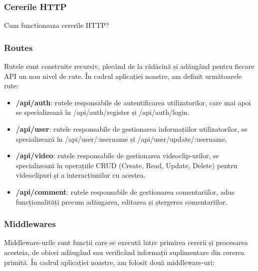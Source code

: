 \subsubsection{Cererile HTTP}
Cum functioneaza cererile HTTP?

\subsubsection{Routes}
Rutele sunt construite recursiv, plecând de la rădăcină și adăugând pentru fiecare API 
un nou nivel de rute. În cadrul aplicației noastre, am definit următoarele rute:

\begin{itemize}
    \item \textbf{/api/auth}: rutele responsabile de autentificarea utilizatorilor, care mai apoi 
    se specializează în /api/auth/register și /api/auth/login.
    \item \textbf{/api/user}: rutele responsabile de gestionarea informațiilor utilizatorilor, se 
    specializează în /api/user/:username și /api/user/update/:username.
    \item \textbf{/api/video}: rutele responsabile de gestionarea videoclip-urilor, se specializează
    în operațiile CRUD (Create, Read, Update, Delete) pentru videoclipuri și a interacțiunilor cu acestea.
    \item \textbf{/api/comment}: rutele responsabile de gestionarea comentariilor, aduc funcționalități
    precum adăugarea, editarea și ștergerea comentariilor.
\end{itemize}

\subsubsection{Middlewares}
Middleware-urile sunt funcții care se execută între primirea cererii și procesarea acesteia,
de obicei adăugând sau verificând informații suplimentare din cererea primită. În cadrul
aplicației noastre, am folosit două middleware-uri:

